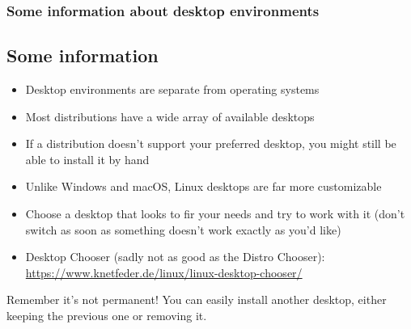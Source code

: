 \begin{frame}
	\frametitle{Some information about desktop environments}
	\subsection{Some information}
	
	\begin{itemize}
		\item Desktop environments are separate from operating systems
		\item Most distributions have a wide array of available desktops
		\item If a distribution doesn't support your preferred desktop, you might still be able to install it by hand
		\item Unlike Windows and macOS, Linux desktops are far more customizable
		\item Choose a desktop that looks to fir your needs and try to work with it (don't switch as soon as something doesn't work exactly as you'd like)
		\item Desktop Chooser\cite{desktopchooser} (sadly not as good as the Distro Chooser): \url{https://www.knetfeder.de/linux/linux-desktop-chooser/}
	\end{itemize}

	\hfill

	\begin{alertblock}{Remember it's not permanent!}
		You can easily install another desktop, either keeping the previous one or removing it.
	\end{alertblock}
\end{frame}
